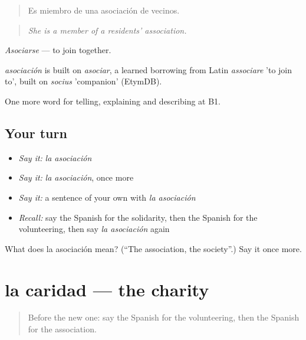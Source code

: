 \begin{quote}
Es miembro de una asociación de vecinos.
\end{quote}

\begin{quote}
\emph{She is a member of a residents' association.}
\end{quote}

\emph{Asociarse} — to join together.

\begin{cousinweb}
\emph{asociación} is built on \emph{asociar}, a learned borrowing from Latin \emph{associare} 'to join to', built on \emph{socius} 'companion' (EtymDB).
\end{cousinweb}

\begin{grammarlens}[title={What you've built}]
One more word for telling, explaining and describing at B1.
\end{grammarlens}

\subsection*{Your turn}
\begin{itemize}
\raggedright
  \item \emph{Say it:} \emph{la asociación}
  \item \emph{Say it:} \emph{la asociación}, once more
  \item \emph{Say it:} a sentence of your own with \emph{la asociación}
  \item \emph{Recall:} say the Spanish for the solidarity, then the Spanish for the volunteering, then say \emph{la asociación} again
\end{itemize}

\begin{tcolorbox}[breakable,colback=teal!4,colframe=teal!35!black,title={Before you move on}]
What does la asociación mean? (\textquotedblleft{}The association, the society\textquotedblright{}.) Say it once more.
\end{tcolorbox}
\section[la caridad]{la caridad — the charity}

\label{lesson:ES-C606-caridad}



\begin{quote}
Before the new one: say the Spanish for the volunteering, then the Spanish for the association.
\end{quote}

